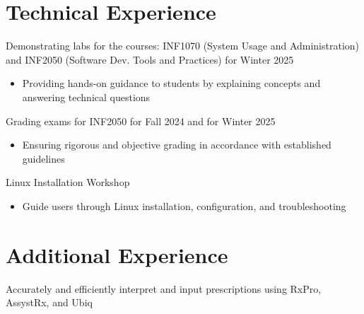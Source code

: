 \documentclass[letterpaper,10pt]{article}
\begin{document}

  \section{Technical Experience}

  \begin{resume_list}
    \item Demonstrating labs for the courses: INF1070 (System Usage and Administration) and INF2050 (Software Dev. Tools and Practices) for Winter 2025
    \begin{itemize}
    \item{Providing hands-on guidance to students by explaining concepts and answering technical questions}
    \end{itemize}
    \vspace{3pt}
    \item Grading exams for INF2050 for Fall 2024 and for Winter 2025
    \begin{itemize}
    \item{Ensuring rigorous and objective grading in accordance with established guidelines}
    \end{itemize}
    \item Linux Installation Workshop
    \begin{itemize}
    \item{Guide users through Linux installation, configuration, and troubleshooting}
    \end{itemize}
  \end{resume_list}

   \section{Additional Experience}

  \begin{resume_list}
    \item Accurately and efficiently interpret and input prescriptions using RxPro, AssystRx, and Ubiq
  \end{resume_list}
\end{document}
